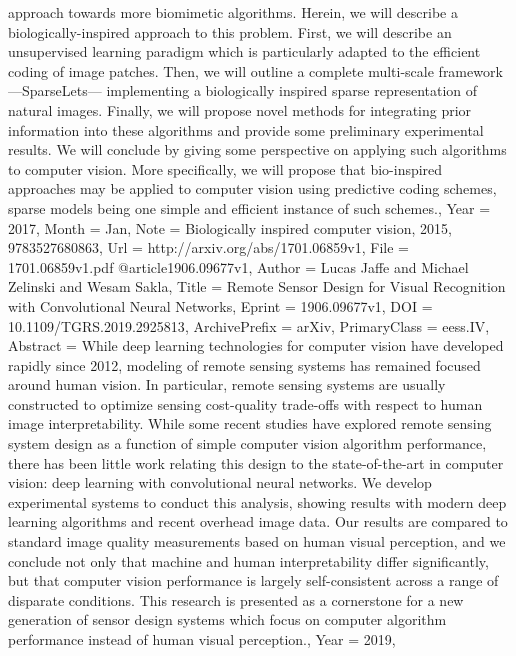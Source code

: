 {{{{approach towards more biomimetic algorithms. Herein, we will describe a
biologically-inspired approach to this problem. First, we will describe an
unsupervised learning paradigm which is particularly adapted to the efficient
coding of image patches. Then, we will outline a complete multi-scale framework
---SparseLets--- implementing a biologically inspired sparse representation of
natural images. Finally, we will propose novel methods for integrating prior
information into these algorithms and provide some preliminary experimental
results. We will conclude by giving some perspective on applying such
algorithms to computer vision. More specifically, we will propose that
bio-inspired approaches may be applied to computer vision using predictive
coding schemes, sparse models being one simple and efficient instance of such
schemes.},
Year          = {2017},
Month         = {Jan},
Note          = {Biologically inspired computer vision, 2015, 9783527680863},
Url           = {http://arxiv.org/abs/1701.06859v1},
File          = {1701.06859v1.pdf}
}
@article{1906.09677v1,
Author        = {Lucas Jaffe and Michael Zelinski and Wesam Sakla},
Title         = {Remote Sensor Design for Visual Recognition with Convolutional Neural
  Networks},
Eprint        = {1906.09677v1},
DOI           = {10.1109/TGRS.2019.2925813},
ArchivePrefix = {arXiv},
PrimaryClass  = {eess.IV},
Abstract      = {While deep learning technologies for computer vision have developed rapidly
since 2012, modeling of remote sensing systems has remained focused around
human vision. In particular, remote sensing systems are usually constructed to
optimize sensing cost-quality trade-offs with respect to human image
interpretability. While some recent studies have explored remote sensing system
design as a function of simple computer vision algorithm performance, there has
been little work relating this design to the state-of-the-art in computer
vision: deep learning with convolutional neural networks. We develop
experimental systems to conduct this analysis, showing results with modern deep
learning algorithms and recent overhead image data. Our results are compared to
standard image quality measurements based on human visual perception, and we
conclude not only that machine and human interpretability differ significantly,
but that computer vision performance is largely self-consistent across a range
of disparate conditions. This research is presented as a cornerstone for a new
generation of sensor design systems which focus on computer algorithm
performance instead of human visual perception.},
Year          = {2019},
}}}
